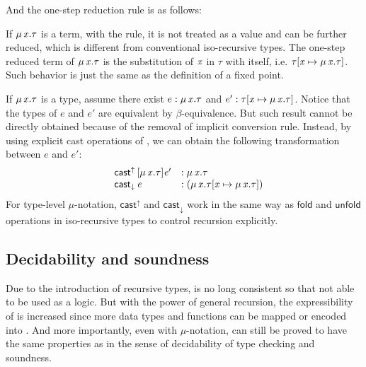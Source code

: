 \begin{figure}[ht]
	\ottusedrule{\ottdruleTXXMu{}}
\end{figure}

And the one-step reduction rule is as follows:

\begin{figure}[ht]
	\ottusedrule{\ottdruleSXXMu{}}
\end{figure}

If $\mu \, \mathit{x}  .  \tau$ is a term, with the  rule, it is not treated as a value and can be further reduced, which is different from conventional iso-recursive types. The one-step reduced term of $\mu \, \mathit{x}  .  \tau$ is the substitution of $\mathit{x}$ in $\tau$ with itself, i.e. $\tau  [  \mathit{x}  \mapsto  \mu \, \mathit{x}  .  \tau  ]$. Such behavior is just the same as the definition of a fixed point.

If $\mu \, \mathit{x}  .  \tau$ is a type, assume there exist $e : \mu \, \mathit{x}  .  \tau$ and $e' : \tau  [  \mathit{x}  \mapsto  \mu \, \mathit{x}  .  \tau  ]$. Notice that the types of $e$ and $e'$ are equivalent by $\beta$-equivalence. But such result cannot be directly obtained because of the removal of implicit conversion rule. Instead, by using explicit cast operations of \expcc, we can obtain the following transformation between $e$ and $e'$:
\[\begin{array}{lll}
	&\mathsf{cast}^{\uparrow} \, [  \mu \, \mathit{x}  .  \tau  ]  \mathit{e'} &: \mu \, \mathit{x}  .  \tau\\
	&\mathsf{cast}_{\downarrow} \, \mathit{e} &: (  \mu \, \mathit{x}  .  \tau  [  \mathit{x}  \mapsto  \mu \, \mathit{x}  .  \tau  ]  )
\end{array}\]
For type-level $\mu$-notation, $ \mathsf{cast}^{\uparrow} $ and $ \mathsf{cast}_{\downarrow} $ work in the same way as $\textsf{fold}$ and $\textsf{unfold}$ operations in iso-recursive types to control recursion explicitly.

\subsection{Decidability and soundness}

Due to the introduction of recursive types, \name is no long consistent so that not able to be used as a logic. But with the power of general recursion, the expressibility of \name is increased since more data types and functions can be mapped or encoded into \name. And more importantly, even with $\mu$-notation, \name can still be proved to have the same properties as \name in the sense of decidability of type checking and soundness.

